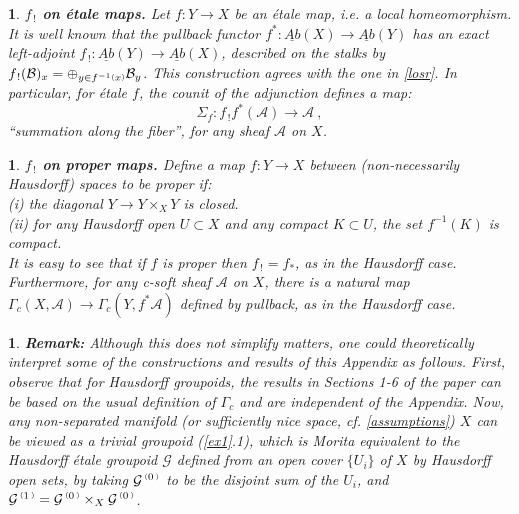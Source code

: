 \documentclass[a4paper]{article}
\newtheorem{num}[st]{}
\newcommand{\rmap}{\longrightarrow}
\newcommand{\G}{\ensuremath{\mathcal{G}}}
\newcommand{\A}{\ensuremath{\mathcal{A}}}
\newcommand{\B}{\ensuremath{\mathcal{B}}}
\newcommand{\gc}{\ensuremath{\Gamma_c}}
\newcommand{\ps}{{\raise 1pt\hbox{\tiny (}}}
\newcommand{\pd}{{\raise 1pt\hbox{\tiny )}}}
\newcommand{\nG}[1]{\ensuremath{\G^{\,\ps #1\,\pd}}}
\begin{document}
\begin{num}
\label{lset}
\emph{
{\bf $f_{\, !}$ on \'etale maps.} Let $f:Y \rmap X$ be an \'etale map, i.e. a local homeomorphism. It is well known that the pullback functor $f^{*}: \underline{Ab}(X) \rmap \underline{Ab}(Y)$ has an exact left-adjoint $f_{\, !}: \underline{Ab}(Y) \rmap \underline{Ab}(X)$, described on the stalks by $f_{\, !}(\B)_{x}= \oplus_{y\in f^{-1}\ps x\pd} \B_{y}$. This construction agrees with the one in \ref{losr}. In particular, for \'etale $f$, the counit of the adjunction defines a map: 
\[ \Sigma_{f}: f_{\, !}f^{*}(\A) \rmap \A\ ,\]
``summation along the fiber'', for any sheaf $\A$ on $X$.
}
\end{num}




\begin{num}
\label{lspr}
\emph{
{\bf $f_{\, !}$ on proper maps.} Define a map $f: Y\rmap X$ between (non-necessarily Hausdorff) spaces to be {\it proper} if:\\
\hspace*{.3in} (i) the diagonal $Y \rmap Y\times_{X} Y$ is closed.\\
\hspace*{.3in} (ii) for any Hausdorff open $U \subset X$ and any compact $K \subset U$, the set $f^{-1}(K)$ is compact.\\
It is easy to see that if $f$ is proper then $f_{\, !}= f_{*}$, as in the Hausdorff case. Furthermore, for any c-soft sheaf $\A$ on $X$, there is a natural map $\gc (X, \A) \rmap \gc(Y, f^{*}\A)$ defined by pullback, as in the Hausdorff case.
}
\end{num}

\begin{num}
\emph{
{\bf Remark:} Although this does not simplify matters, one could theoretically interpret some of the constructions and results of this Appendix as follows. First, observe that for {\it Hausdorff} groupoids, the results in Sections 1-6 of the paper can be based on the usual definition of $\Gamma_c$ and are independent of the Appendix. Now, any non-separated manifold (or sufficiently nice space, cf. \ref{assumptions}) $X$ can be viewed as a trivial groupoid (\ref{ex1}.1), which is Morita equivalent to the Hausdorff \'etale groupoid $\G$ defined from an open cover $\{ U_i\}$ of $X$ by Hausdorff open sets, by taking $\nG{0}$ to be the disjoint sum of the $U_i$, and $\nG{1}= \nG{0}\times_X\nG{0}$.
}
\end{num}
\end{document}
